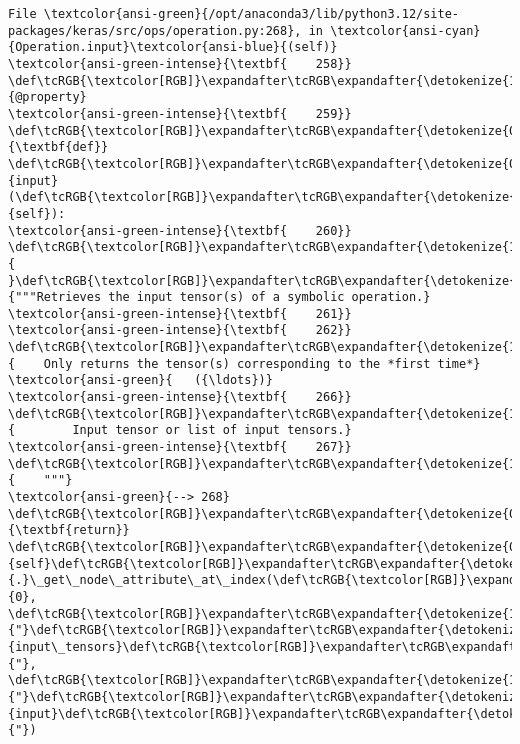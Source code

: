 \documentclass[11pt]{article}
\begin{document}
\begin{Verbatim}[commandchars=\\\{\}, frame=single, framerule=2mm, rulecolor=\color{outerrorbackground}]
File \textcolor{ansi-green}{/opt/anaconda3/lib/python3.12/site-packages/keras/src/ops/operation.py:268}, in \textcolor{ansi-cyan}{Operation.input}\textcolor{ansi-blue}{(self)}
\textcolor{ansi-green-intense}{\textbf{    258}} \def\tcRGB{\textcolor[RGB]}\expandafter\tcRGB\expandafter{\detokenize{175,0,255}}{@property}
\textcolor{ansi-green-intense}{\textbf{    259}} \def\tcRGB{\textcolor[RGB]}\expandafter\tcRGB\expandafter{\detokenize{0,135,0}}{\textbf{def}} \def\tcRGB{\textcolor[RGB]}\expandafter\tcRGB\expandafter{\detokenize{0,0,255}}{input}(\def\tcRGB{\textcolor[RGB]}\expandafter\tcRGB\expandafter{\detokenize{0,135,0}}{self}):
\textcolor{ansi-green-intense}{\textbf{    260}} \def\tcRGB{\textcolor[RGB]}\expandafter\tcRGB\expandafter{\detokenize{188,188,188}}{    }\def\tcRGB{\textcolor[RGB]}\expandafter\tcRGB\expandafter{\detokenize{175,0,0}}{"""Retrieves the input tensor(s) of a symbolic operation.}
\textcolor{ansi-green-intense}{\textbf{    261}} 
\textcolor{ansi-green-intense}{\textbf{    262}} \def\tcRGB{\textcolor[RGB]}\expandafter\tcRGB\expandafter{\detokenize{175,0,0}}{    Only returns the tensor(s) corresponding to the *first time*}
\textcolor{ansi-green}{   ({\ldots})}
\textcolor{ansi-green-intense}{\textbf{    266}} \def\tcRGB{\textcolor[RGB]}\expandafter\tcRGB\expandafter{\detokenize{175,0,0}}{        Input tensor or list of input tensors.}
\textcolor{ansi-green-intense}{\textbf{    267}} \def\tcRGB{\textcolor[RGB]}\expandafter\tcRGB\expandafter{\detokenize{175,0,0}}{    """}
\textcolor{ansi-green}{--> 268}     \def\tcRGB{\textcolor[RGB]}\expandafter\tcRGB\expandafter{\detokenize{0,135,0}}{\textbf{return}} \def\tcRGB{\textcolor[RGB]}\expandafter\tcRGB\expandafter{\detokenize{0,135,0}}{self}\def\tcRGB{\textcolor[RGB]}\expandafter\tcRGB\expandafter{\detokenize{98,98,98}}{.}\_get\_node\_attribute\_at\_index(\def\tcRGB{\textcolor[RGB]}\expandafter\tcRGB\expandafter{\detokenize{98,98,98}}{0}, \def\tcRGB{\textcolor[RGB]}\expandafter\tcRGB\expandafter{\detokenize{175,0,0}}{"}\def\tcRGB{\textcolor[RGB]}\expandafter\tcRGB\expandafter{\detokenize{175,0,0}}{input\_tensors}\def\tcRGB{\textcolor[RGB]}\expandafter\tcRGB\expandafter{\detokenize{175,0,0}}{"}, \def\tcRGB{\textcolor[RGB]}\expandafter\tcRGB\expandafter{\detokenize{175,0,0}}{"}\def\tcRGB{\textcolor[RGB]}\expandafter\tcRGB\expandafter{\detokenize{175,0,0}}{input}\def\tcRGB{\textcolor[RGB]}\expandafter\tcRGB\expandafter{\detokenize{175,0,0}}{"})


\end{Verbatim}
\end{document}
